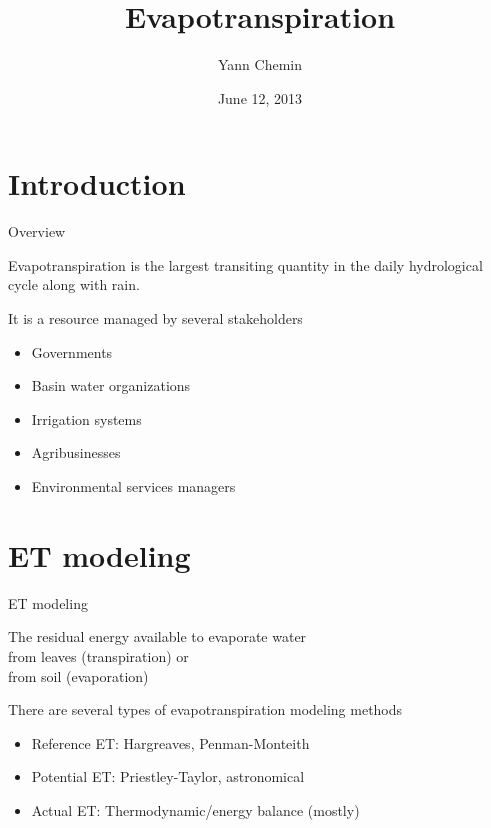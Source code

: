 \documentclass[xcolor=dvipsnames,beamer]{beamer} %
\title[Evapotranspiration]
{Evapotranspiration}
\author[Yann Chemin]
{Yann Chemin}
\institute[IWMI]
{International Water Management Institute\\
\vspace{20pt}
}
\date{June 12, 2013}
\begin{document}
\frame{
\titlepage
}

\section{Introduction}
\begin{frame}[fragile]{Overview}

Evapotranspiration is the largest transiting quantity in the daily 
hydrological cycle along with rain. 
\newline

It is a resource managed by several stakeholders
\begin{itemize}
 \item Governments
 \item Basin water organizations
 \item Irrigation systems
 \item Agribusinesses
 \item Environmental services managers
\end{itemize}


\end{frame}

\section{ET modeling}
\begin{frame}[fragile]{ET modeling}

The residual energy available to evaporate water \\
from leaves (transpiration) or \\
from soil (evaporation) \\

\begin{block}{There are several types of evapotranspiration modeling methods}
\begin{itemize}
 \item Reference ET: Hargreaves, Penman-Monteith
 \item Potential ET: Priestley-Taylor, astronomical
 \item Actual ET: Thermodynamic/energy balance (mostly)
\end{itemize}
\end{block}

\end{frame}
\end{document}
